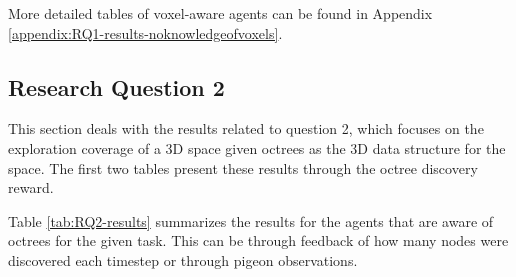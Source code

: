 More detailed tables of voxel-aware agents can be found in Appendix \ref{appendix:RQ1-results-noknowledgeofvoxels}.







\subsection{Research Question 2}\label{chap:4:results-RQ2}

This section deals with the results related to question 2, which focuses on the exploration coverage of a 3D space given octrees as the 3D data structure for the space. 
The first two tables present these results through the octree discovery reward.

Table \ref{tab:RQ2-results} summarizes the results for the agents that are aware of octrees for the given task. This can be through feedback of how many nodes were discovered each timestep or through pigeon observations. 

